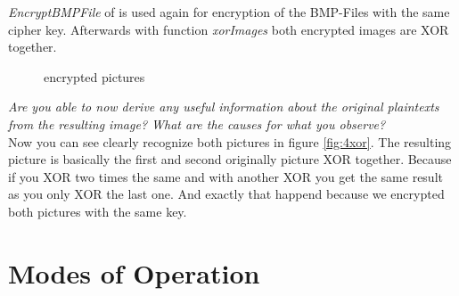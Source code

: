 \textit{EncryptBMPFile} of  is used again for encryption of the BMP-Files with the same cipher key. Afterwards with function \textit{xorImages} both encrypted images are XOR together.

\begin{figure}[htp]
    \centering
    \caption{encrypted pictures}
\end{figure}

\textit{Are you able to now derive any useful information about the original plaintexts from the resulting image? What are the causes for what you observe?}\\
Now you can see clearly recognize both pictures in figure \ref{fig:4xor}. The resulting picture is basically the first and second originally picture XOR together. Because if you XOR two times the same and with another XOR you get the same result as you only XOR the last one. And exactly that happend because we encrypted both pictures with the same key.\\


\section{Modes of Operation}


